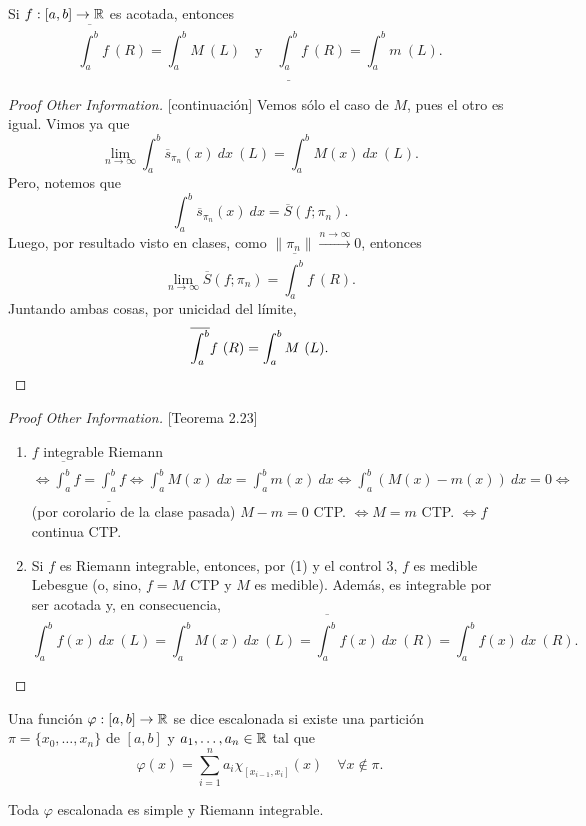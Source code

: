 
\begin{prop}
	Si $f : [a,b] \to \mathbb{R}$ es acotada, entonces
	\[ \overline{\int_{a}^{b}} f \ (R) = \int_{a}^{b} M \ (L) \quad \text{y} \quad \underline{\int_{a}^{b}} f \ (R) = \int_{a}^{b} m \ (L). \]
\end{prop}
\begin{proof}[Proof Other Information][continuación]
	Vemos sólo el caso de $M$, pues el otro es igual. Vimos ya que
	\[ \lim_{n \to \infty} \int_{a}^{b} \overline{s}_{\pi_{n}}(x) \ dx \ (L) = \int_{a}^{b} M(x) \ dx \ (L). \]
	Pero, notemos que
	\[ \int_{a}^{b} \overline{s}_{\pi_{n}}(x) \ dx = \overline{S}(f; \pi_{n}). \]
	Luego, por resultado visto en clases, como $\| \pi_{n} \| \stackrel{n \to \infty}{\longrightarrow} 0$, entonces
	\[ \lim_{n \to \infty} \overline{S}(f; \pi_{n}) = \overline{\int_{a}^{b}} f \ (R). \]
	Juntando ambas cosas, por unicidad del límite,
	\[ \overline{\int_{a}^{b}} f \ (R) = \int_{a}^{b} M \ (L). \qedhere \]
\end{proof}
\begin{proof}[Proof Other Information][Teorema 2.23]
	\begin{enumerate}
		\item $f$ integrable Riemann $\iff \overline{\int_{a}^{b}} f = \underline{\int_{a}^{b}} f \iff \int_{a}^{b} M(x) \ dx = \int_{a}^{b} m(x) \ dx \iff \int_{a}^{b} (M(x) - m(x)) \ dx = 0 \iff$ (por corolario de la clase pasada) $M - m = 0$ CTP. $\iff M = m$ CTP. $\iff f$ continua CTP.

		\item Si $f$ es Riemann integrable, entonces, por (1) y el control 3, $f$ es medible Lebesgue (o, sino, $f = M$ CTP y $M$ es medible). Además, es integrable por ser acotada y, en consecuencia,
		\[ \int_{a}^{b} f(x) \ dx \ (L) = \int_{a}^{b} M(x) \ dx \ (L) = \overline{\int_{a}^{b}} f(x) \ dx \ (R) = \int_{a}^{b} f(x) \ dx \ (R). \]
	\end{enumerate}
\end{proof}

\begin{definition}
	Una función $\varphi : [a,b] \to \mathbb{R}$ se dice escalonada si existe una partición $\pi = \{x_{0},\dots,x_{n}\}$ de $[a,b]$ y $a_{1},\dots,a_{n} \in \mathbb{R}$ tal que
	\[ \varphi(x) = \sum_{i=1}^{n} a_{i} \chi_{[x_{i-1},x_{i}]}(x) \quad \forall x \not\in \pi. \]
\end{definition}

\begin{remark}
	Toda $\varphi$ escalonada es simple y Riemann integrable.
\end{remark}

